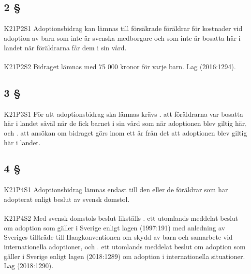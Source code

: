 \documentclass[a4paper,notitlepage,openany,10pt]{book}
\begin{document}
\subsection*{2 §}
\paragraph*{}
{\tiny K21P2S1}
Adoptionsbidrag kan lämnas till försäkrade föräldrar för kostnader vid adoption av barn som inte är svenska medborgare och som inte är bosatta här i landet när föräldrarna får dem i sin vård.
\paragraph*{}
{\tiny K21P2S2}
Bidraget lämnas med 75 000 kronor för varje barn.
Lag (2016:1294).
\subsection*{3 §}
\paragraph*{}
{\tiny K21P3S1}
För att adoptionsbidrag ska lämnas krävs
. att föräldrarna var bosatta här i landet såväl när de fick barnet i sin vård som när adoptionen blev giltig här, och
. att ansökan om bidraget görs inom ett år från det att adoptionen blev giltig här i landet.
\subsection*{4 §}
\paragraph*{}
{\tiny K21P4S1}
Adoptionsbidrag lämnas endast till den eller de föräldrar som har adopterat enligt beslut av svensk domstol.
\paragraph*{}
{\tiny K21P4S2}
Med svensk domstols beslut likställs
. ett utomlands meddelat beslut om adoption som gäller i Sverige enligt lagen (1997:191) med anledning av Sveriges tillträde till Haagkonventionen om skydd av barn och samarbete vid internationella adoptioner, och
. ett utomlands meddelat beslut om adoption som gäller i Sverige enligt lagen (2018:1289) om adoption i internationella situationer.
Lag (2018:1290).
\end{document}
